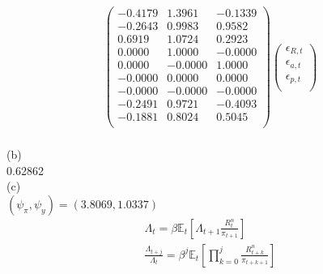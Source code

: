 \documentclass{article}
\begin{document}
\begin{CJK}{UTF8}{min}
\begin{align*}
\begin{pmatrix}
    -0.4179 & 1.3961 & -0.1339 \\
   -0.2643 & 0.9983 &  0.9582 \\
    0.6919 & 1.0724 &  0.2923 \\
    0.0000 & 1.0000 & -0.0000 \\
    0.0000 & -0.0000 & 1.0000 \\
   -0.0000 & 0.0000 &  0.0000 \\
   -0.0000 & -0.0000 & -0.0000 \\
   -0.2491 & 0.9721 & -0.4093 \\
   -0.1881 & 0.8024 &  0.5045 \\
 \end{pmatrix}
 \begin{pmatrix}
\epsilon_{R,t}\\
\epsilon_{a,t}\\
\epsilon_{p,t}\\
\end{pmatrix}
\end{align*}
\\
(b)\\
0.62862\\
(c)\\
$(\psi_\pi,\psi_y)=(3.8069,1.0337)$\\
\begin{align*}
\Lambda_t=\beta\mathbb{E}_t[\Lambda_{t+1}\frac{R_t^n}{\pi_{t+1}}]\\
\frac{\Lambda_{t+j}}{\Lambda_t}=\beta^j\mathbb{E}_t[\prod^j_{k=0}\frac{R^n_{t+k}}{\pi_{t+k+1}}]
\end{align*}
\end{CJK}
\end{document}

